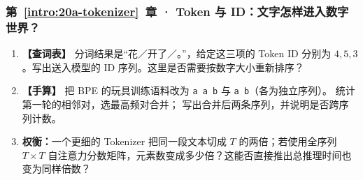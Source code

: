 \subsubsection*{第~\ref*{intro:20a-tokenizer}~章 · Token 与 ID：文字怎样进入数字世界？}
\begin{enumerate}[label={},leftmargin=4.8em,itemsep=4pt]
\item[\textbf{C-037.}] \leavevmode{}\label{exercise:C-037}\label{exercise:token-id-lookup}\textbf{【查词表】} 分词结果是“花／开了／。”，给定这三项的 Token ID 分别为 $4,5,3$。写出送入模型的 ID 序列。这里是否需要按数字大小重新排序？
\item[\textbf{C-038.}] \leavevmode{}\label{exercise:C-038}\label{exercise:bpe-pair-merge}\textbf{【手算】} 把 BPE 的玩具训练语料改为
\texttt{a a b} 与 \texttt{a b}（各为独立序列）。
统计第一轮的相邻对，选最高频对合并；
写出合并后两条序列，并说明是否跨序列计数。
\item[\textbf{C-039.}] \leavevmode{}\label{exercise:C-039}\label{exercise:tokenizer-attention-cost}\textbf{权衡：}一个更细的 Tokenizer 把同一段文本切成 $T$ 的两倍；若使用全序列 $T\times T$ 自注意力分数矩阵，元素数变成多少倍？这能否直接推出总推理时间也变为同样倍数？
\end{enumerate}
